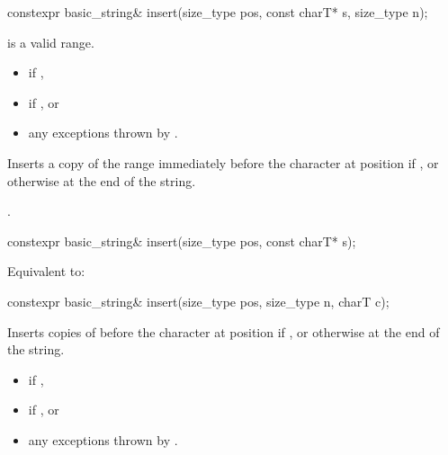%
\begin{itemdecl}
constexpr basic_string& insert(size_type pos, const charT* s, size_type n);
\end{itemdecl}

\begin{itemdescr}
\pnum
\expects
{} is a valid range.

\pnum
\throws
\begin{itemize}
\item {} if ,
\item {} if , or
\item any exceptions thrown by .
\end{itemize}

\pnum
\effects
Inserts a copy of the range 
immediately before the character at position  if ,
or otherwise at the end of the string.

\pnum
\returns
{}.
\end{itemdescr}

%
\begin{itemdecl}
constexpr basic_string& insert(size_type pos, const charT* s);
\end{itemdecl}

\begin{itemdescr}
\pnum
\effects
Equivalent to: 
\end{itemdescr}

%
\begin{itemdecl}
constexpr basic_string& insert(size_type pos, size_type n, charT c);
\end{itemdecl}

\begin{itemdescr}
\pnum
\effects
Inserts  copies of  before the character at position 
if ,
or otherwise at the end of the string.

\pnum
\returns
{}

\pnum
\throws
\begin{itemize}
\item {} if ,
\item {} if , or
\item any exceptions thrown by .
\end{itemize}
\end{itemdescr}

